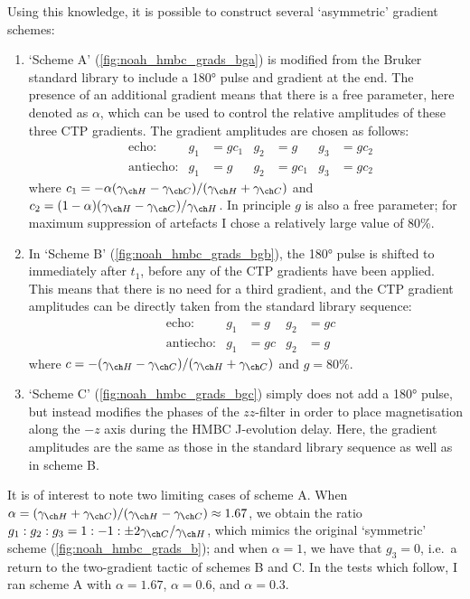 Using this knowledge, it is possible to construct several `asymmetric' gradient schemes:
\begin{enumerate}
    \item `Scheme A' (\cref{fig:noah_hmbc_grads_bga}) is modified from the Bruker standard library to include a \ang{180} pulse and gradient at the end.
        The presence of an additional gradient means that there is a free parameter, here denoted as $\alpha$, which can be used to control the relative amplitudes of these three CTP gradients.
        The gradient amplitudes are chosen as follows:
        \begin{align}
            &\text{echo:}     & g_1 &= gc_1 & g_2 &= g    & g_3 &= gc_2 \label{eq:noah_hmbc_grads_bga_echo} \\
            &\text{antiecho:} & g_1 &= g    & g_2 &= gc_1 & g_3 &= gc_2 \label{eq:noah_hmbc_grads_bga_antiecho}
        \end{align}
        where $c_1 = -\alpha(\gammaH - \gammaC)/(\gammaH + \gammaC)$ and $c_2 = (1 - \alpha) (\gammaH - \gammaC)/\gammaH$.
        In principle $g$ is also a free parameter; for maximum suppression of artefacts I chose a relatively large value of 80\%.
    \item In `Scheme B' (\cref{fig:noah_hmbc_grads_bgb}), the \ang{180} pulse is shifted to immediately after $t_1$, before any of the CTP gradients have been applied. This means that there is no need for a third gradient, and the CTP gradient amplitudes can be directly taken from the standard library sequence:
        \begin{align}
            &\text{echo:}     & g_1 &= g  & g_2 &= gc \label{eq:noah_hmbc_grads_bgb_echo} \\
            &\text{antiecho:} & g_1 &= gc & g_2 &= g \label{eq:noah_hmbc_grads_bgb_antiecho}
        \end{align}
        where $c = -(\gammaH - \gammaC)/(\gammaH + \gammaC)$ and $g = 80\%$.
    \item `Scheme C' (\cref{fig:noah_hmbc_grads_bgc}) simply does not add a \ang{180} pulse, but instead modifies the phases of the $zz$-filter in order to place  magnetisation along the $-z$ axis during the HMBC J-evolution delay.
        Here, the gradient amplitudes are the same as those in the standard library sequence as well as in scheme B.
\end{enumerate}

It is of interest to note two limiting cases of scheme A.
When $\alpha = (\gammaH + \gammaC)/(\gammaH - \gammaC) \approx 1.67$, we obtain the ratio $g_1 : g_2 : g_3 = 1 : -1 : \pm 2\gammaC/\gammaH$, which mimics the original `symmetric' scheme (\cref{fig:noah_hmbc_grads_b}); and when $\alpha = 1$, we have that $g_3 = 0$, i.e.\ a return to the two-gradient tactic of schemes B and C.
In the tests which follow, I ran scheme A with $\alpha = 1.67$, $\alpha = 0.6$, and $\alpha = 0.3$.

